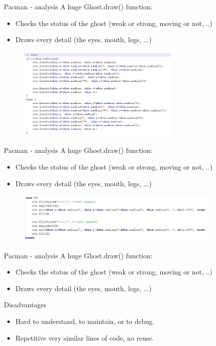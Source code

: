 \documentclass{beamer}
\begin{document}
\begin{frame}{Pacman - analysis}
A huge Ghost.draw() function:
 \begin{itemize}
      \item Checks the status of the ghost (weak or strong, moving or not, ..)
      \item Draws every detail (the eyes, mouth, legs, ...)
    \end{itemize}
   \begin{figure}[htp]
    \centering
    \includegraphics[width=8cm]{pics/Legs}
    \label{fig:legs}
    \end{figure}
\end{frame}

\begin{frame}{Pacman - analysis}
A huge Ghost.draw() function:
 \begin{itemize}
      \item Checks the status of the ghost (weak or strong, moving or not, ..)
      \item Draws every detail (the eyes, mouth, legs, ...)
    \end{itemize}
   \begin{figure}[htp]
    \centering
    \includegraphics[width=10cm]{pics/Code}
    \label{fig:eyes}
    \end{figure}
\end{frame}

\begin{frame}{Pacman - analysis}
A huge Ghost.draw() function:
 \begin{itemize}
      \item Checks the status of the ghost (weak or strong, moving or not, ..)
      \item Draws every detail (the eyes, mouth, legs, ...)
    \end{itemize}
 \begin{block}{Disadvantages}
      \begin{itemize} 
    \item Hard to understand, to maintain, or to debug.
    \item Repetitive very similar lines of code, no reuse.
    \end{itemize}
    \end{block}
\end{frame}
\end{document}
